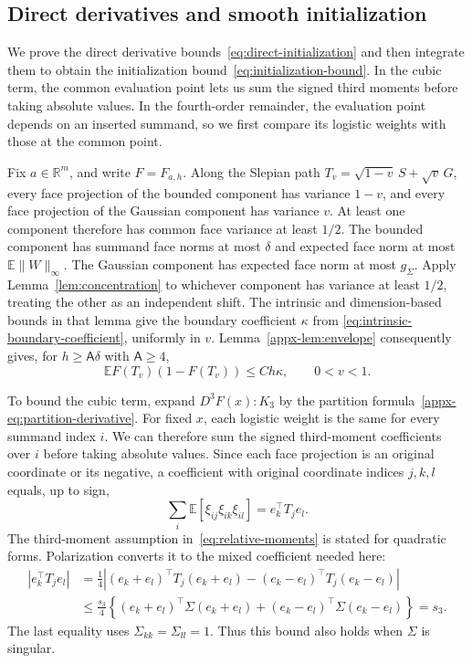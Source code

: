 \documentclass[11pt,letterpaper,twoside,leqno]{article}
\theoremstyle{bookplain}
\theoremstyle{bookremark}
\newcommand{\E}{\mathbb E}
\newcommand{\R}{\mathbb R}
\begin{document}
\subsection{Direct derivatives and smooth initialization}
\label{appx-an:sec:initialization}

We prove the direct derivative bounds~\eqref{eq:direct-initialization}
and then integrate them to obtain the initialization
bound~\eqref{eq:initialization-bound}. In the cubic term, the common
evaluation point lets us sum the signed third moments before taking
absolute values. In the fourth-order remainder, the evaluation point
depends on an inserted summand, so we first compare its logistic
weights with those at the common point.

Fix \(a\in\R^m\), and write \(F=F_{a,h}\).
Along the Slepian path
\(T_v=\sqrt{1-v}\,S+\sqrt v\,G\), every face projection of the
bounded component has variance \(1-v\), and every face projection
of the Gaussian component has variance \(v\). At least one component
therefore has common face variance at least \(1/2\).
The bounded component has summand face norms at most \(\delta\)
and expected face norm at most \(\E\|W\|_\infty\).
The Gaussian component has expected face norm at most \(g_\Sigma\).
Apply Lemma~\ref{lem:concentration} to whichever component has
variance at least \(1/2\), treating the other as an independent
shift. The intrinsic and dimension-based bounds in that lemma give
the boundary coefficient \(\kappa\) from
\eqref{eq:intrinsic-boundary-coefficient}, uniformly in \(v\).
Lemma~\ref{appx-lem:envelope} consequently gives, for
\(h\ge\mathsf A\delta\) with \(\mathsf A\ge4\),
\begin{equation}
 \E F(T_v)(1-F(T_v))\le Ch\kappa,
 \qquad 0<v<1.
 \label{eq:slepian-weight}
\end{equation}

To bound the cubic term, expand \(D^3F(x):K_3\) by the partition
formula~\eqref{appx-eq:partition-derivative}. For fixed $x$, each
logistic weight is the same for every summand index $i$. We can
therefore sum the signed third-moment coefficients over $i$ before
taking absolute values. Since each face projection is an original
coordinate or its
negative, a coefficient with original coordinate indices \(j,k,l\)
equals, up to sign,
\[
 \sum_i\E[\xi_{ij}\xi_{ik}\xi_{il}]=e_k^\top T_j e_l.
\]
The third-moment assumption in~\eqref{eq:relative-moments} is stated
for quadratic forms. Polarization converts it to the mixed
coefficient needed here:
\[
 \begin{aligned}
 |e_k^\top T_j e_l|
 &=\frac14\left|
   (e_k+e_l)^\top T_j(e_k+e_l)
   -(e_k-e_l)^\top T_j(e_k-e_l)\right|\\
 &\le\frac{s_3}{4}\left\{
   (e_k+e_l)^\top\Sigma(e_k+e_l)
   +(e_k-e_l)^\top\Sigma(e_k-e_l)\right\}
 =s_3.
 \end{aligned}
\]
The last equality uses \(\Sigma_{kk}=\Sigma_{ll}=1\).
Thus this bound also holds when \(\Sigma\) is singular.
\end{document}
